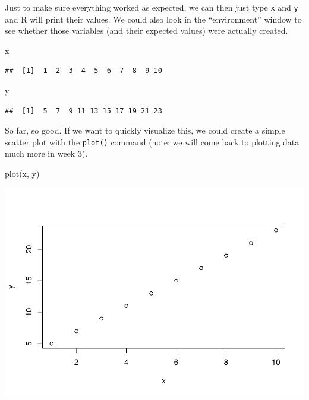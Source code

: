\documentclass[
]{book}
\newenvironment{Shaded}{\begin{snugshade}}{\end{snugshade}}
\newcommand{\FunctionTok}[1]{\textcolor[rgb]{0.00,0.00,0.00}{#1}}
\newcommand{\NormalTok}[1]{#1}
\begin{document}
Just to make sure everything worked as expected, we can then just type \texttt{x} and \texttt{y} and R will print their values. We could also look in the ``environment'' window to see whether those variables (and their expected values) were actually created.

\begin{Shaded}
\begin{Highlighting}[]
\NormalTok{x}
\end{Highlighting}
\end{Shaded}

\begin{verbatim}
##  [1]  1  2  3  4  5  6  7  8  9 10
\end{verbatim}

\begin{Shaded}
\begin{Highlighting}[]
\NormalTok{y}
\end{Highlighting}
\end{Shaded}

\begin{verbatim}
##  [1]  5  7  9 11 13 15 17 19 21 23
\end{verbatim}

So far, so good. If we want to quickly visualize this, we could create a simple scatter plot with the \texttt{plot()} command (note: we will come back to plotting data much more in week 3).

\begin{Shaded}
\begin{Highlighting}[]
\FunctionTok{plot}\NormalTok{(x, y)}
\end{Highlighting}
\end{Shaded}

\includegraphics{test_course_notes_files/figure-latex/unnamed-chunk-3-1.pdf}
\end{document}
